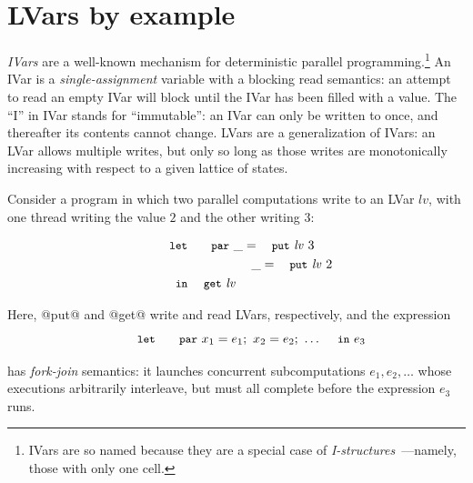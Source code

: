 \section{LVars by example}\label{s:lvars-examples}

\emph{IVars} \cite{IStructures, id, monad-par} are a well-known
mechanism for deterministic parallel programming.\footnote{IVars are so named
  because they are a special case of
  \emph{I-structures}~\cite{IStructures}---namely, those with only one
  cell.}  An IVar is a
\emph{single-assignment} variable \cite{Tesler-1968} with a blocking
read semantics: an attempt to read an empty IVar will block until the
IVar has been filled with a value.  The ``I'' in IVar stands for
``immutable'': an IVar can only be written to once, and thereafter its
contents cannot change.  LVars are a generalization of IVars: an LVar
allows multiple writes, but only so long as those writes are
monotonically increasing with respect to a given
lattice of states.

Consider a program in which two
parallel computations write to an LVar $\mathit{lv}$, with one thread
writing the value $2$ and the other writing $3$:

\vspace{-8mm}
\singlespacing
\begin{equation}
\begin{split}
& \LETPAR ~\_ = \putexp{\mathit{lv}}{3} \\
&  \letparspace ~\_ = \putexp{\mathit{lv}}{2} \\
&  \letspace \IN~ \GET~\mathit{lv}
\end{split}
\label{e:lvar-example-1}
\end{equation}
\doublespacing

Here, @put@ and @get@ write and read LVars,
respectively, and the expression
%
\vspace{-8mm}
\singlespacing
\begin{displaymath}
\letparexp{x_1}{e_1}{x_2}{e_2;~\dots}{e_3}
\end{displaymath}
\doublespacing

has \emph{fork-join} semantics: it launches concurrent subcomputations
$e_1, e_2, \dots$ whose executions arbitrarily interleave, but must
all complete before the expression $e_3$ runs.


